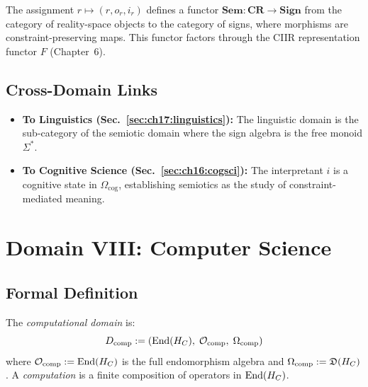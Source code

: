 \begin{theorem}\label{thm:17.2}
The assignment $r \mapsto (r, o_r, i_r)$ defines a functor
$\mathbf{Sem} : \mathbf{CR} \to \mathbf{Sign}$ from the category
of reality-space objects to the category of signs, where morphisms
are constraint-preserving maps.  This functor factors through the
CIIR representation functor $F$ (Chapter~6).
\end{theorem}

\subsection{Cross-Domain Links}

\begin{itemize}
  \item \textbf{To Linguistics (Sec.~\ref{sec:ch17:linguistics}):}
        The linguistic domain is the sub-category of the semiotic
        domain where the sign algebra is the free monoid
        $\Sigma^*$.
  \item \textbf{To Cognitive Science (Sec.~\ref{sec:ch16:cogsci}):}
        The interpretant $i$ is a cognitive state in
        $\Omega_{\mathrm{cog}}$, establishing semiotics as the
        study of constraint-mediated meaning.
\end{itemize}

\section{Domain VIII: Computer Science}
\label{sec:ch17:cs}

\subsection{Formal Definition}

\begin{definition}\label{def:17.6}
The \emph{computational domain} is:
\[
  D_{\mathrm{comp}} := (\mathrm{End}(H_C),\;
                        \mathcal{O}_{\mathrm{comp}},\;
                        \Omega_{\mathrm{comp}})
\]
where $\mathcal{O}_{\mathrm{comp}} := \mathrm{End}(H_C)$ is the
full endomorphism algebra and $\Omega_{\mathrm{comp}} :=
\mathfrak{D}(H_C)$.  A \emph{computation} is a finite composition
of operators in $\mathrm{End}(H_C)$.
\end{definition}

